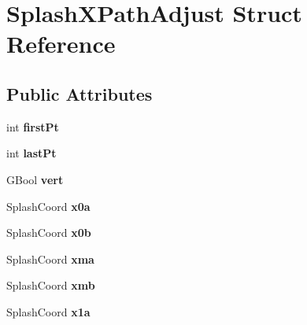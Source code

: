 \hypertarget{struct_splash_x_path_adjust}{}\section{Splash\+X\+Path\+Adjust Struct Reference}
\label{struct_splash_x_path_adjust}
\subsection*{Public Attributes}
\begin{DoxyCompactItemize}
\item 
\mbox{\label{struct_splash_x_path_adjust_a05740c918b72cf416105fd2c8c2405ed}} 
int {\bfseries first\+Pt}
\item 
\mbox{\label{struct_splash_x_path_adjust_aa61a89b30a59383f901771f2201e3616}} 
int {\bfseries last\+Pt}
\item 
\mbox{\label{struct_splash_x_path_adjust_a995fbe4cac9f8d6e8f5571743862693a}} 
G\+Bool {\bfseries vert}
\item 
\mbox{\label{struct_splash_x_path_adjust_a4fbc79b9177e52778cbb6dea3b09b6de}} 
Splash\+Coord {\bfseries x0a}
\item 
\mbox{\label{struct_splash_x_path_adjust_a1c4bbab8a728335899db69083adae672}} 
Splash\+Coord {\bfseries x0b}
\item 
\mbox{\label{struct_splash_x_path_adjust_a563d7eb7373f99fc45b99d5d33d76679}} 
Splash\+Coord {\bfseries xma}
\item 
\mbox{\label{struct_splash_x_path_adjust_ae82be593931a6a0f218703a9a9804fea}} 
Splash\+Coord {\bfseries xmb}
\item 
\mbox{\label{struct_splash_x_path_adjust_ac6f16c8c76d39369193909ab526ccd5f}} 
Splash\+Coord {\bfseries x1a}
\item 
\mbox{\label{struct_splash_x_path_adjust_a6ba08c95cb25b3bfa5faedbb07318f92}} 

\end{DoxyCompactItemize}
